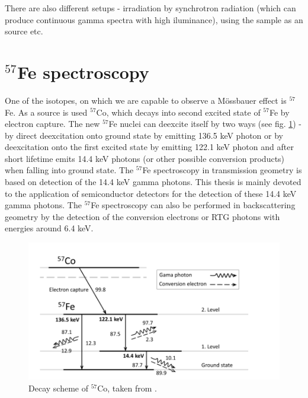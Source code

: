 \par
There are also different setups - irradiation by synchrotron radiation (which can produce continuous gamma spectra with high iluminance), using the sample as an source etc.



\section{$^{57}$Fe spectroscopy}

One of the isotopes, on which we are capable to observe a Mössbauer effect is $^{57}$Fe. As a source is used $^{57}$Co, which decays into second excited state of $^{57}$Fe by electron capture. The new $^{57}$Fe nuclei can deexcite itself by two ways (see fig. \ref{Fe57scheme}) - by direct deexcitation onto ground state by emitting 136.5 keV photon or by deexcitation onto the first excited state by emitting 122.1 keV photon and after short lifetime emits 14.4 keV photons (or other possible conversion products) when falling into ground state. The $^{57}$Fe spectroscopy in transmission geometry is based on detection of the 14.4 keV gamma photons. This thesis is mainly devoted to the application of semiconductor detectors for the detection of these 14.4 keV gamma photons. The $^{57}$Fe spectroscopy can also be performed in backscattering geometry by the detection of the conversion electrons or RTG photons with energies around 6.4 keV.

\begin{figure}[H]
 \centering
 \includegraphics[scale=0.75, angle = 0]{./pictures/Fe57}
 \caption{Decay scheme of $^{57}$Co, taken from \cite{NOVAK2016thesis}.}
 \label{Fe57scheme}
 
\end{figure}


